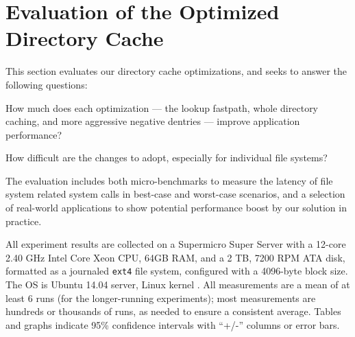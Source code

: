 
\section{Evaluation of the Optimized Directory Cache}
\label{sec:dcache:eval}

This section evaluates our directory cache optimizations,
and seeks to answer the following questions:
\begin{compactenum}
\item How much does each optimization --- the lookup fastpath, whole directory caching, and more aggressive negative dentries --- improve application performance?  
\item How difficult are the changes to adopt, especially for individual file systems?
\end{compactenum}


The evaluation includes both 
micro-benchmarks to measure the latency of file system related system calls in best-case and worst-case scenarios,
and a selection of real-world applications to show potential performance boost by our solution in practice.


All experiment results are collected on a Supermicro Super Server with a 12-core 2.40 GHz Intel Core Xeon CPU, 64GB RAM, and a 2 TB, 7200 RPM ATA disk,
formatted as a journaled {\tt ext4} file system, configured with a 4096-byte block size.
The OS is Ubuntu 14.04 server, Linux kernel \linuxver{}. 
All measurements are a mean of at least 6 runs (for the longer-running experiments);
most measurements are hundreds or thousands of runs, as needed to ensure a consistent average.
Tables and graphs indicate 
95\% confidence intervals 
with ``+/-'' columns or error bars.

